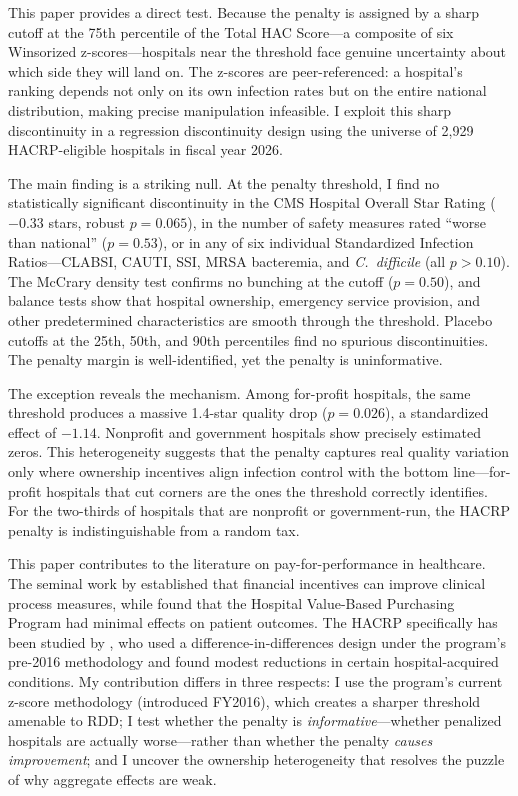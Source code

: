 \documentclass[12pt]{article}
\begin{document}
This paper provides a direct test. Because the penalty is assigned by a sharp cutoff at the 75th percentile of the Total HAC Score---a composite of six Winsorized z-scores---hospitals near the threshold face genuine uncertainty about which side they will land on. The z-scores are peer-referenced: a hospital's ranking depends not only on its own infection rates but on the entire national distribution, making precise manipulation infeasible. I exploit this sharp discontinuity in a regression discontinuity design using the universe of 2{,}929 HACRP-eligible hospitals in fiscal year 2026.

The main finding is a striking null. At the penalty threshold, I find no statistically significant discontinuity in the CMS Hospital Overall Star Rating ($-0.33$ stars, robust $p = 0.065$), in the number of safety measures rated ``worse than national'' ($p = 0.53$), or in any of six individual Standardized Infection Ratios---CLABSI, CAUTI, SSI, MRSA bacteremia, and \textit{C.\ difficile} (all $p > 0.10$). The McCrary density test confirms no bunching at the cutoff ($p = 0.50$), and balance tests show that hospital ownership, emergency service provision, and other predetermined characteristics are smooth through the threshold. Placebo cutoffs at the 25th, 50th, and 90th percentiles find no spurious discontinuities. The penalty margin is well-identified, yet the penalty is uninformative.

The exception reveals the mechanism. Among for-profit hospitals, the same threshold produces a massive 1.4-star quality drop ($p = 0.026$), a standardized effect of $-1.14$. Nonprofit and government hospitals show precisely estimated zeros. This heterogeneity suggests that the penalty captures real quality variation only where ownership incentives align infection control with the bottom line---for-profit hospitals that cut corners are the ones the threshold correctly identifies. For the two-thirds of hospitals that are nonprofit or government-run, the HACRP penalty is indistinguishable from a random tax.

This paper contributes to the literature on pay-for-performance in healthcare. The seminal work by \citet{rosenthal2004early} established that financial incentives can improve clinical process measures, while \citet{jha2012low} found that the Hospital Value-Based Purchasing Program had minimal effects on patient outcomes. The HACRP specifically has been studied by \citet{birstler2019impact}, who used a difference-in-differences design under the program's pre-2016 methodology and found modest reductions in certain hospital-acquired conditions. My contribution differs in three respects: I use the program's current z-score methodology (introduced FY2016), which creates a sharper threshold amenable to RDD; I test whether the penalty is \textit{informative}---whether penalized hospitals are actually worse---rather than whether the penalty \textit{causes improvement}; and I uncover the ownership heterogeneity that resolves the puzzle of why aggregate effects are weak.
\end{document}
